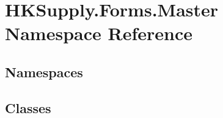 \hypertarget{namespace_h_k_supply_1_1_forms_1_1_master}{}\section{H\+K\+Supply.\+Forms.\+Master Namespace Reference}
\label{namespace_h_k_supply_1_1_forms_1_1_master}
\subsection*{Namespaces}
\begin{DoxyCompactItemize}
\end{DoxyCompactItemize}
\subsection*{Classes}
